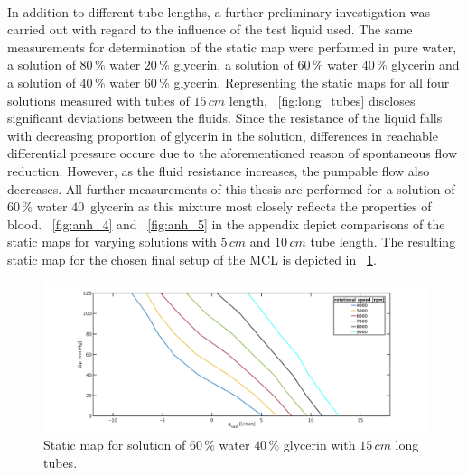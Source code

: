\\In addition to different tube lengths, a further preliminary investigation was carried out with regard to the influence of the test liquid used. The same measurements for determination of the static map were performed in pure water, a solution of $80\, \%$ water $20\, \%$ glycerin, a solution of $60\, \%$ water $40\, \%$ glycerin and a solution of $40\, \%$ water $60\, \%$ glycerin. Representing the static maps for all four solutions measured with tubes of $15\, cm$ length, \figurename~\ref{fig:long_tubes} discloses significant deviations between the fluids. Since the resistance of the liquid falls with decreasing proportion of glycerin in the solution, differences in reachable differential pressure occure due to the aforementioned reason of spontaneous flow reduction. However, as the fluid resistance increases, the pumpable flow also decreases. All further measurements of this thesis are performed for a solution of $60\, \%$ water $40\,$ glycerin as this mixture most closely reflects the properties of blood.
\figurename~\ref{fig:anh_4} and \figurename~\ref{fig:anh_5} in the appendix depict comparisons of the static maps for varying  solutions with $5\, cm$ and $10\, cm$ tube length.
The resulting static map for the chosen final setup of the MCL is depicted in \figurename~\ref{fig:60w40glong}.

\begin{figure}[ht]
  \centering
  \includegraphics[width=\textwidth]{images/plots_syst_ident/60w40g_long.pdf}
  \caption[Static map for solution of $60\, \%$ water $40\, \%$ glycerin with $15\,cm$ long tubes]{Static map for solution of $60\, \%$ water $40\, \%$ glycerin with $15\,cm$ long tubes.}
  \label{fig:60w40glong}
\end{figure}


